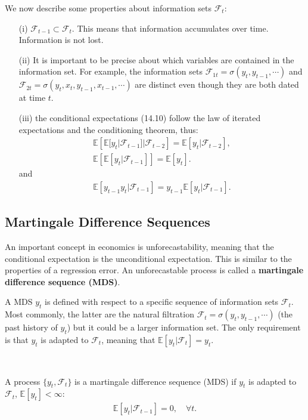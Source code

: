 We now describe some properties about information sets $\mathcal{F}_t$:
\begin{enumerate}
    \item[(i)] $\mathcal{F}_{t-1} \subset \mathcal{F}_{t}$. This means that information accumulates over time. Information
    is not lost. 
    \item[(ii)] It is important to be precise about which variables are contained in the information set.
    For example, the information sets $\mathcal{F}_{1t} = \sigma (y_t, y_{t-1}, \cdots)$ and $\mathcal{F}_{2t} = \sigma (y_t, x_t, y_{t-1}, x_{t-1}, \cdots)$ are distinct even though they are both dated at time $t$.
    \item[(iii)] the conditional expectations (14.10) follow the law of iterated expectations and the conditioning theorem, thus:
    \begin{gather*}
        \mathbb{E}\left[ \mathbb{E}[y_t | \mathcal{F}_{t-1}] | \mathcal{F}_{t-2} \right] = \mathbb{E}[y_t | \mathcal{F}_{t-2}], \\
        \mathbb{E}\left[ \mathbb{E}[y_t | \mathcal{F}_{t-1}] \right] = \mathbb{E}[y_t].
    \end{gather*}
    and
    \begin{gather*}
        \mathbb{E}\left[y_{t-1} y_t | \mathcal{F}_{t-1} \right] = y_{t-1} \mathbb{E}[y_t | \mathcal{F}_{t-1}].
    \end{gather*}
\end{enumerate}

\subsection{Martingale Difference Sequences}
An important concept in economics is unforecastability, meaning that the conditional expectation is
the unconditional expectation. This is similar to the properties of a regression error. An unforecastable
process is called a \textbf{martingale difference sequence (MDS)}.

A MDS $y_t$ is defined with respect to a specific sequence of information sets $\mathcal{F}_t$.
Most commonly, the latter are the natural filtration $\mathcal{F}_t = \sigma(y_t, y_{t-1}, \cdots)$
(the past history of $y_t$) but it could be a larger information set.
The only requirement is that $y_t$ is adapted to $\mathcal{F}_t$, meaning that $\mathbb{E}[y_t | \mathcal{F}_t] = y_t$.

\begin{definition}\label{def:martingale-difference-sequence}
    \

    A process $\{y_t, \mathcal{F}_t\}$ is a martingale difference sequence (MDS) if $y_t$ is adapted to $\mathcal{F}_t$, $\mathbb{E}[y_t] < \infty$:
    \begin{gather*}
        \mathbb{E}[y_t | \mathcal{F}_{t-1}] = 0, \quad \forall t.
    \end{gather*}
\end{definition}

